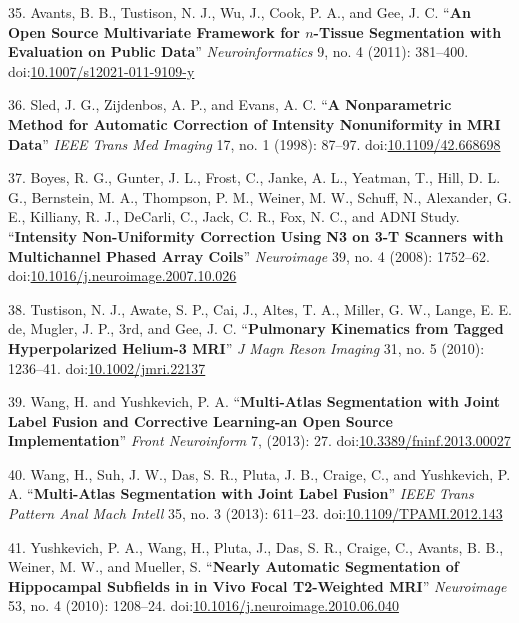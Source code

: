 \documentclass[11pt,]{article}
\begin{document}
35. Avants, B. B., Tustison, N. J., Wu, J., Cook, P. A., and Gee, J. C.
``\textbf{An Open Source Multivariate Framework for $n$-Tissue
Segmentation with Evaluation on Public Data}'' \emph{Neuroinformatics}
9, no. 4 (2011): 381--400.
doi:\href{http://dx.doi.org/10.1007/s12021-011-9109-y}{10.1007/s12021-011-9109-y}

36. Sled, J. G., Zijdenbos, A. P., and Evans, A. C. ``\textbf{A
Nonparametric Method for Automatic Correction of Intensity Nonuniformity
in MRI Data}'' \emph{IEEE Trans Med Imaging} 17, no. 1 (1998): 87--97.
doi:\href{http://dx.doi.org/10.1109/42.668698}{10.1109/42.668698}

37. Boyes, R. G., Gunter, J. L., Frost, C., Janke, A. L., Yeatman, T.,
Hill, D. L. G., Bernstein, M. A., Thompson, P. M., Weiner, M. W.,
Schuff, N., Alexander, G. E., Killiany, R. J., DeCarli, C., Jack, C. R.,
Fox, N. C., and ADNI Study. ``\textbf{Intensity Non-Uniformity
Correction Using N3 on 3-T Scanners with Multichannel Phased Array
Coils}'' \emph{Neuroimage} 39, no. 4 (2008): 1752--62.
doi:\href{http://dx.doi.org/10.1016/j.neuroimage.2007.10.026}{10.1016/j.neuroimage.2007.10.026}

38. Tustison, N. J., Awate, S. P., Cai, J., Altes, T. A., Miller, G. W.,
Lange, E. E. de, Mugler, J. P., 3rd, and Gee, J. C. ``\textbf{Pulmonary
Kinematics from Tagged Hyperpolarized Helium-3 MRI}'' \emph{J Magn Reson
Imaging} 31, no. 5 (2010): 1236--41.
doi:\href{http://dx.doi.org/10.1002/jmri.22137}{10.1002/jmri.22137}

39. Wang, H. and Yushkevich, P. A. ``\textbf{Multi-Atlas Segmentation
with Joint Label Fusion and Corrective Learning-an Open Source
Implementation}'' \emph{Front Neuroinform} 7, (2013): 27.
doi:\href{http://dx.doi.org/10.3389/fninf.2013.00027}{10.3389/fninf.2013.00027}

40. Wang, H., Suh, J. W., Das, S. R., Pluta, J. B., Craige, C., and
Yushkevich, P. A. ``\textbf{Multi-Atlas Segmentation with Joint Label
Fusion}'' \emph{IEEE Trans Pattern Anal Mach Intell} 35, no. 3 (2013):
611--23.
doi:\href{http://dx.doi.org/10.1109/TPAMI.2012.143}{10.1109/TPAMI.2012.143}

41. Yushkevich, P. A., Wang, H., Pluta, J., Das, S. R., Craige, C.,
Avants, B. B., Weiner, M. W., and Mueller, S. ``\textbf{Nearly Automatic
Segmentation of Hippocampal Subfields in in Vivo Focal T2-Weighted
MRI}'' \emph{Neuroimage} 53, no. 4 (2010): 1208--24.
doi:\href{http://dx.doi.org/10.1016/j.neuroimage.2010.06.040}{10.1016/j.neuroimage.2010.06.040}
\end{document}
